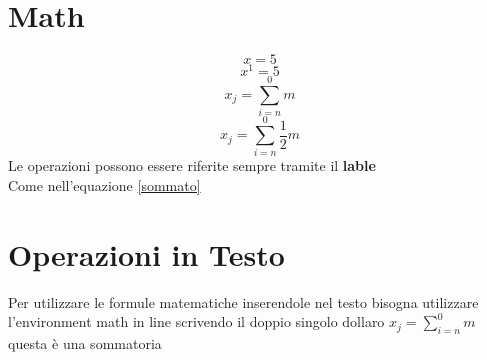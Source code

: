 \documentclass{article}
\begin{document}
\section{Math}
\begin{equation}
    x = 5
\end{equation}
\begin{equation}
    x^1 = 5
\end{equation}
\begin{equation}
\label{sommato}
    x_j = \sum^{0}_{i=n}m
\end{equation}
\begin{equation}
    x_j = \sum^{0}_{i=n} \frac{1}{2}m
\end{equation}
Le operazioni possono essere riferite sempre tramite il \textbf{lable}\\
Come nell'equazione \ref{sommato}

\section{Operazioni in Testo}
Per utilizzare le formule matematiche inserendole nel testo bisogna utilizzare l'environment math in line scrivendo il doppio singolo dollaro $ x_j = \sum^{0}_{i=n}m$ questa è una sommatoria 
\end{document}
